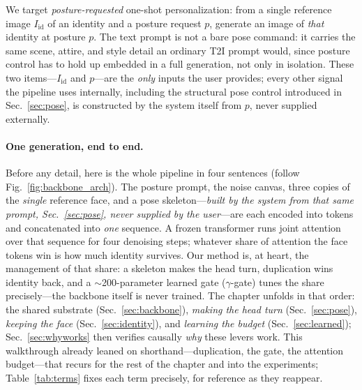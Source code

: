\label{sec:method}

We target \emph{posture-requested} one-shot personalization: from a single reference image $I_{\mathrm{id}}$ of an identity and a posture request $p$, generate an image of \emph{that} identity at posture $p$. The text prompt is not a bare pose command: it carries the same scene, attire, and style detail an ordinary T2I prompt would, since posture control has to hold up embedded in a full generation, not only in isolation. These two items---$I_{\mathrm{id}}$ and $p$---are the \emph{only} inputs the user provides; every other signal the pipeline uses internally, including the structural pose control introduced in Sec.~\ref{sec:pose}, is constructed by the system itself from $p$, never supplied externally.

\paragraph{One generation, end to end.} Before any detail, here is the whole pipeline in four sentences (follow Fig.~\ref{fig:backbone_arch}). The posture prompt, the noise canvas, three copies of the \emph{single} reference face, and a pose skeleton---\emph{built by the system from that same prompt, Sec.~\ref{sec:pose}, never supplied by the user}---are each encoded into tokens and concatenated into \emph{one} sequence. A frozen transformer runs joint attention over that sequence for four denoising steps; whatever share of attention the face tokens win is how much identity survives. Our method is, at heart, the management of that share: a skeleton makes the head turn, duplication wins identity back, and a $\sim$200-parameter learned gate ($\gamma$-gate) tunes the share precisely---the backbone itself is never trained. The chapter unfolds in that order: the shared substrate (Sec.~\ref{sec:backbone}), \emph{making the head turn} (Sec.~\ref{sec:pose}), \emph{keeping the face} (Sec.~\ref{sec:identity}), and \emph{learning the budget} (Sec.~\ref{sec:learned}); Sec.~\ref{sec:whyworks} then verifies causally \emph{why} these levers work. This walkthrough already
leaned on shorthand---duplication, the gate, the attention budget---that
recurs for the rest of the chapter and into the experiments; Table~\ref{tab:terms}
fixes each term precisely, for reference as they reappear.

